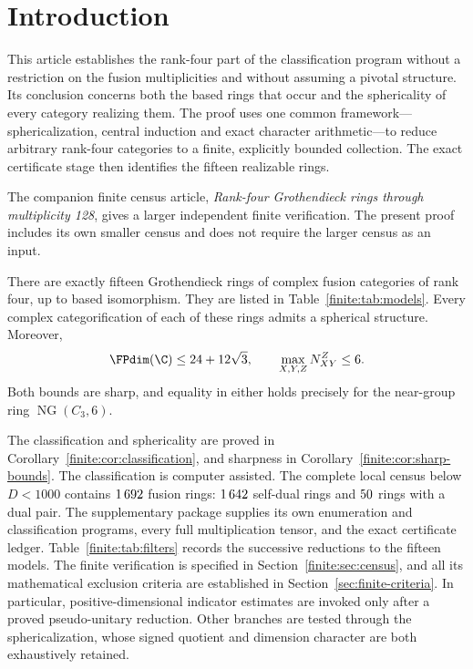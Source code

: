 \section{Introduction}\label{sec:introduction}
This article establishes the rank-four part of the classification program
without a restriction on the fusion multiplicities and without assuming
a pivotal structure. Its conclusion concerns both the based rings that
occur and the sphericality of every category realizing them. The proof
uses one common framework---sphericalization, central induction and exact
character arithmetic---to reduce arbitrary rank-four categories to a
finite, explicitly bounded collection. The exact certificate stage then
identifies the fifteen realizable rings.

The companion finite census article, \emph{Rank-four Grothendieck rings
through multiplicity 128}, gives a larger independent finite verification.
The present proof includes its own smaller census and does not require
the larger census as an input.

\begin{theorem}[Classification]\label{thm:classification}
There are exactly fifteen Grothendieck rings of complex fusion categories
of rank four, up to based isomorphism. They are listed in
Table~\ref{finite:tab:models}. Every complex categorification of each of
these rings admits a spherical structure. Moreover,
\[
 \FPdim(\C)\le24+12\sqrt3,\qquad
 \max_{X,Y,Z}N_{XY}^{Z}\le6.
\]
Both bounds are sharp, and equality in either holds precisely for the
near-group ring $\operatorname{NG}(C_3,6)$.
\end{theorem}



The classification and sphericality are proved in
Corollary~\ref{finite:cor:classification}, and sharpness in
Corollary~\ref{finite:cor:sharp-bounds}.
The classification is computer assisted. The complete local census below
$D<1000$ contains $1\,692$ fusion rings: $1\,642$ self-dual
rings and $50$ rings with a dual pair.
The supplementary package supplies its own enumeration and classification
programs, every full multiplication tensor, and the exact certificate
ledger. Table~\ref{finite:tab:filters} records the successive reductions
to the fifteen models. The finite verification is
specified in Section~\ref{finite:sec:census}, and all its mathematical
exclusion criteria are established in Section~\ref{sec:finite-criteria}.
In particular, positive-dimensional indicator estimates are invoked only
after a proved pseudo-unitary reduction. Other branches are tested through
the sphericalization, whose signed quotient and dimension character are
both exhaustively retained.

